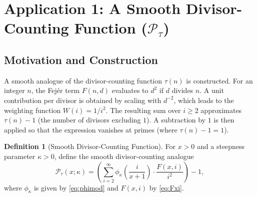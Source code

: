 \documentclass[11pt,a4paper]{amsart}
\theoremstyle{plain}
\theoremstyle{definition}
\newtheorem{definition}[theorem]{Definition}
\theoremstyle{remark}
\begin{document}
\section{Application 1: A Smooth Divisor-Counting Function (\texorpdfstring{$\mathcal{P}_{\tau}$}{P_tau})}

\subsection{Motivation and Construction}
A smooth analogue of the divisor-counting function $\tau(n)$ is constructed. For an integer $n$, the Fejér term $F(n,d)$ evaluates to $d^2$ if $d$ divides $n$. A unit contribution per divisor is obtained by scaling with $d^{-2}$, which leads to the weighting function $W(i)=1/i^2$. The resulting sum over $i \ge 2$ approximates $\tau(n)-1$ (the number of divisors excluding $1$). A subtraction by $1$ is then applied so that the expression vanishes at primes (where $\tau(n)-1=1$).

\begin{definition}[Smooth Divisor-Counting Function]
For $x>0$ and a steepness parameter $\kappa>0$, define the smooth divisor-counting analogue
\begin{equation}\label{eq:Ptau}
\mathcal{P}_{\tau}(x; \kappa) = \left( \sum_{i=2}^{\infty} \phi_{\kappa}\!\left(\frac{i}{x+1}\right) \cdot \frac{F(x,i)}{i^2} \right) - 1,
\end{equation}
where $\phi_{\kappa}$ is given by \eqref{eq:phimod} and $F(x,i)$ by \eqref{eq:Fxi}.
\end{definition}
\end{document}
